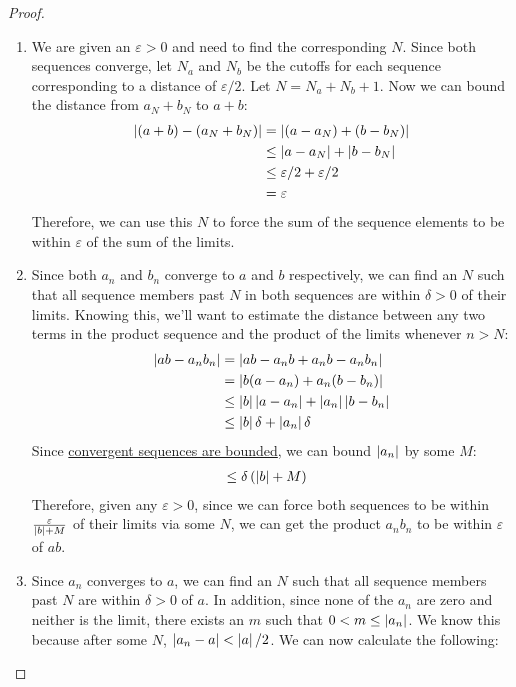\begin{proof}
\begin{enumerate}
\item We are given an $\varepsilon > 0$ and need to find the corresponding $N$. Since both sequences converge, let $N_a$ and $N_b$ be the cutoffs for each sequence corresponding to a distance of $\varepsilon/2$. Let $N = N_a + N_b + 1$. Now we can bound the distance from $a_N+b_N$ to $a+b$:
\begin{align*}
\left\lvert (a+b)-(a_N+b_N) \right\rvert &= \left\lvert (a-a_N)+(b-b_N) \right\rvert\\
&\leq \left\lvert a-a_N \right\rvert+\left\lvert b-b_N \right\rvert\\
&\leq \varepsilon/2 + \varepsilon/2\\
&= \varepsilon
\end{align*}
Therefore, we can use this $N$ to force the sum of the sequence elements to be within $\varepsilon$ of the sum of the limits.
\item Since both $a_n$ and $b_n$ converge to $a$ and $b$ respectively, we can find an $N$ such that all sequence members past $N$ in both sequences are within $\delta > 0$ of their limits. Knowing this, we'll want to estimate the distance between any two terms in the product sequence and the product of the limits whenever $n>N$:
\begin{align*}
\left\lvert ab-a_nb_n \right\rvert &= \left\lvert ab-a_nb+a_nb-a_nb_n \right\rvert\\
&= \left\lvert b(a-a_n)+a_n(b-b_n) \right\rvert\\
&\leq \left\lvert b \right\rvert\left\lvert a-a_n \right\rvert + \left\lvert a_n \right\rvert\left\lvert b-b_n \right\rvert\\
&\leq \left\lvert b \right\rvert\delta + \left\lvert a_n \right\rvert\delta
\end{align*}
Since \hyperlink{Convergent Sequences are Bounded}{convergent sequences are bounded}, we can bound $\left\lvert a_n \right\rvert$ by some $M$:
\begin{align*}
&\leq \delta\left(\left\lvert b \right\rvert+M\right)
\end{align*}
Therefore, given any $\varepsilon > 0$, since we can force both sequences to be within $\frac{\varepsilon}{\left\lvert b \right\rvert+M}$ of their limits via some $N$, we can get the product $a_nb_n$ to be within $\varepsilon$ of $ab$.
\item Since $a_n$ converges to $a$, we can find an $N$ such that all sequence members past $N$ are within $\delta > 0$ of $a$. In addition, since none of the $a_n$ are zero and neither is the limit, there exists an $m$ such that $0 < m \leq \left\lvert a_n \right\rvert$. We know this because after some $N$, $\left\lvert a_n-a \right\rvert<\left\lvert a \right\rvert/2$. We can now calculate the following:

\end{enumerate}
\end{proof}
